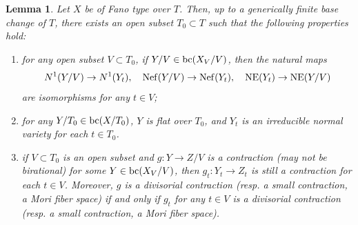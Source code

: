 \documentclass[11pt,oneside,reqno]{amsart}
\numberwithin{equation}{section}
\newtheorem{lemma}[proposition]{Lemma}
\theoremstyle{definition}
\newcommand{\Nef}{{\rm {Nef}}}
\newcommand{\bc}{{\rm {bc}}}
\newcommand{\NE}{{\rm {NE}}}
\begin{document}
 \begin{lemma}\label{lem: uniform behavior in bc}
Let $X$ be of Fano type over $T$. Then, up to a generically finite base change of $T$, there exists an open subset $T_0\subset T$ such that the following properties hold:
\begin{enumerate}
\item for any open subset $V\subset T_0$, if $Y/V\in \bc(X_{V}/V)$, then the natural maps
\[
N^1(Y/V) \to N^1(Y_t), \quad \Nef(Y/V) \to \Nef(Y_t), \quad \NE(Y_t) \to \NE(Y/V)
\] are isomorphisms for any $t\in V$;
\item for any $Y/T_0\in \bc(X/T_0)$, $Y$ is flat over $T_0$, and $Y_t$ is an irreducible normal variety for each $t\in T_0$. 

\item if $V\subset T_0$ is an open subset and $g: Y \to Z/V$ is a contraction (may not be birational) for some $Y \in \bc(X_{V}/V)$, then $g_t: Y_t \to Z_t$ is still a contraction for each $t\in V$. Moreover, $g$ is a divisorial contraction (resp. a small contraction, a Mori fiber space) if and only if $g_t$ for any $t\in V$ is a divisorial contraction (resp. a small contraction, a Mori fiber space).
\end{enumerate}
 \end{lemma}
\end{document}
